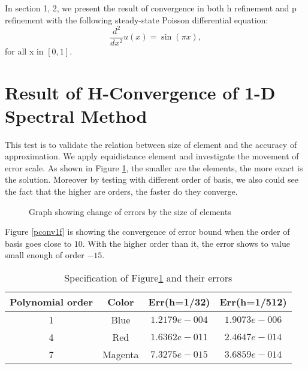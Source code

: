 In section 1, 2, we present the result of convergence in both h
refinement and p refinement with the following steady-state
Poisson differential equation:
\begin{equation*}
    \frac{d^2}{dx^2} u(x) = \sin(\pi x),
\end{equation*}
for all x in $[0, 1]$.


\section {Result of H-Convergence of 1-D Spectral Method}

This test is to validate the relation between size of element and
the accuracy of approximation. We apply equidistance element and
investigate the movement of error scale. As shown in Figure
\ref{hconv1f}, the smaller are the elements, the more exact is the
solution. Moreover by testing with different order of basis, we
also could see the fact that the higher are orders, the faster do
they converge.

\begin{figure}[h]
\begin{center}
\caption{\label{hconv1f}Graph showing change of errors by the size
of elements}
\end{center}
\end{figure}

Figure \ref{pconv1f} is showing the convergence of error bound
when the order of basis goes close to $10$. With the higher order
than it, the error shows to value small enough of order $-15$.

\begin{table}[h]
\centering \caption{\label{hconv1t} Specification of
                              Figure\ref{hconv1f} and their errors}
\begin{tabular}{|c|c|c|c|} \hline
Polynomial order&Color&Err(h=1/32)&Err(h=1/512)   \\ \hline \hline
    1&Blue   &$1.2179e-004$ &$1.9073e-006$ \\ \hline
    4&Red    &$1.6362e-011$ &$2.4647e-014$ \\ \hline
    7&Magenta&$7.3275e-015$ &$3.6859e-014$ \\ \hline
\end{tabular}
\end{table}

\clearpage

